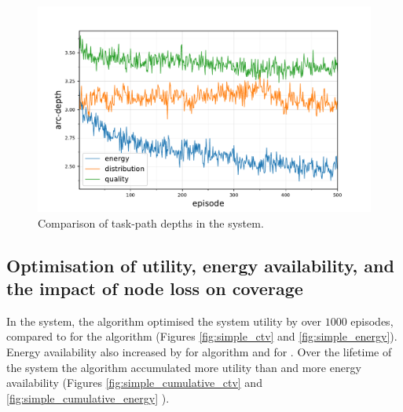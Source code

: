 \begin{figure}[ht]
	\begin{minipage}{.49\textwidth}
		\centering
		\includegraphics[width=1.0\linewidth,trim={25pt 0pt 50pt 0pt},clip]{5.19_ctv-arc-depth-comparison}
		\caption{Comparison of task-path depths  in the \simulationExtended{}{} system.}
		\label{fig:extended_arc_depth}
	\end{minipage}\hfill%
\begin{minipage}{.49\textwidth}
\end{minipage}
\end{figure}

\subsection{Optimisation of utility, energy availability, and the  impact of node loss on coverage}
In the \simulationSimple{}{} system, the \acronymWSNOptimisation{}{} algorithm optimised the system utility by \resultsSimpleCTVBalancedDiff{}{} over $1000$ episodes, compared to \resultsSimpleCTVQRoutingDiff{}{} for the \algorithmQRouting{}{} algorithm (Figures \ref{fig:simple_ctv} and \ref{fig:simple_energy}). Energy availability also increased by \resultsSimpleEnergyBalancedDiff{}{} for \algorithmBalanced{}{} algorithm and \resultsSimpleEnergyQRoutingDiff{}{} for \algorithmQRouting{}{}. Over the lifetime of the system the \algorithmBalanced{}{} algorithm accumulated \resultsSimpleCumulativeCTVComparison{}{} more utility than \algorithmQRouting{}{} and \resultsSimpleCumulativeEnergyComparison{}{} more energy availability (Figures \ref{fig:simple_cumulative_ctv} and \ref{fig:simple_cumulative_energy} ).

